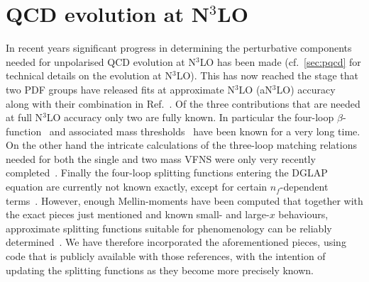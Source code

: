 
\section{QCD evolution at N$^3$LO}
\label{sec:n3lo-evolution}
In recent years significant progress in determining the perturbative
components needed for unpolarised QCD evolution at N$^3$LO has been
made (cf.\ \ref{sec:pqcd} for technical details on the evolution at
N$^3$LO).
%
This has now reached the stage that two PDF groups have released fits
at approximate N$^3$LO (aN$^3$LO)
accuracy~\cite{McGowan:2022nag,NNPDF:2024nan} along with their
combination in Ref.~\cite{Cridge:2024icl}.
%
Of the three contributions that are needed at full N$^3$LO accuracy
only two are fully known.
%
In particular the four-loop
$\beta$-function~\cite{vanRitbergen:1997va,Czakon:2004bu} and
associated mass thresholds~\cite{Chetyrkin:1997sg} have been known for
a very long time.
%
On the other hand the intricate calculations of the three-loop
matching relations needed for both the single and two mass VFNS were
only very recently
completed~\cite{Bierenbaum:2009mv,Ablinger:2010ty,Kawamura:2012cr,Blumlein:2012vq,ABLINGER2014263,Ablinger:2014nga,Ablinger:2014vwa,Behring:2014eya,Ablinger:2019etw,Behring:2021asx,Ablinger:2023ahe,Ablinger:2024xtt,Ablinger:2025awb}.
%
Finally the four-loop splitting functions entering the DGLAP equation
are currently not known exactly, except for certain $n_f$-dependent
terms~\cite{Gracey:1994nn,Davies:2016jie,Moch:2017uml,Gehrmann:2023cqm,Falcioni:2023tzp,Gehrmann:2023iah,Kniehl:2025ttz}.
%
However, enough Mellin-moments have been computed that together with
the exact pieces just mentioned and known small- and large-$x$
behaviours, approximate splitting functions suitable for phenomenology
can be reliably
determined~\cite{McGowan:2022nag,NNPDF:2024nan,Moch:2021qrk,Falcioni:2023luc,Falcioni:2023vqq,Moch:2023tdj,Falcioni:2024xyt,Falcioni:2024qpd}.
%
We have therefore incorporated the aforementioned pieces, using code
that is publicly available with those references, with the intention of
updating the splitting functions as they become more precisely known.

